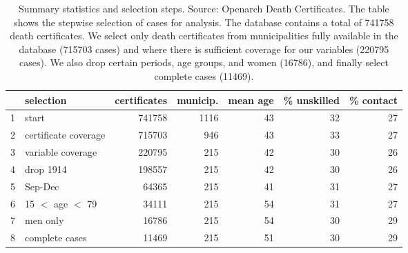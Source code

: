 \begin{table}[ht]
\centering
\begin{tabular}{rlrrrrr}
  \hline
 & selection & certificates & municip. & mean age & \% unskilled & \% contact \\ 
  \hline
1 & start & 741758 & 1116 & 43 & 32 & 27 \\ 
  2 & certificate coverage & 715703 & 946 & 43 & 33 & 27 \\ 
  3 & variable coverage & 220795 & 215 & 42 & 30 & 26 \\ 
  4 & drop 1914 & 198557 & 215 & 42 & 30 & 26 \\ 
  5 & Sep-Dec & 64365 & 215 & 41 & 31 & 27 \\ 
  6 & 15 $<$ age $<$ 79 & 34111 & 215 & 54 & 31 & 27 \\ 
  7 & men only & 16786 & 215 & 54 & 30 & 29 \\ 
  8 & complete cases & 11469 & 215 & 51 & 30 & 29 \\ 
   \hline
\end{tabular}
\caption{Summary statistics and selection steps. Source: Openarch Death Certificates. The table shows the stepwise selection of cases for analysis. The database contains a total of 741758 death certificates. We select only death certificates from municipalities fully available in the database (715703 cases) and where there is sufficient coverage for our variables (220795 cases). We also drop certain periods, age groups, and women (16786), and finally select complete cases (11469).} 
\label{sumselect}
\end{table}
